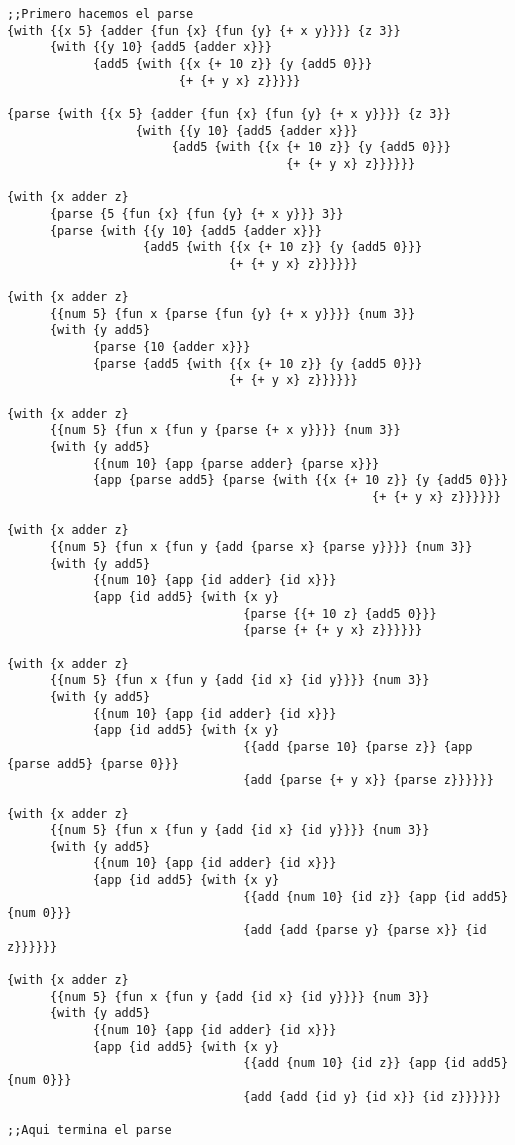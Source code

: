 \documentclass[a4paper]{article}
\begin{document}
\begin{verbatim}
;;Primero hacemos el parse
{with {{x 5} {adder {fun {x} {fun {y} {+ x y}}}} {z 3}}
      {with {{y 10} {add5 {adder x}}}
            {add5 {with {{x {+ 10 z}} {y {add5 0}}} 
                        {+ {+ y x} z}}}}}

{parse {with {{x 5} {adder {fun {x} {fun {y} {+ x y}}}} {z 3}}
                  {with {{y 10} {add5 {adder x}}}
                       {add5 {with {{x {+ 10 z}} {y {add5 0}}} 
		    	                       {+ {+ y x} z}}}}}}

{with {x adder z}
      {parse {5 {fun {x} {fun {y} {+ x y}}} 3}}
      {parse {with {{y 10} {add5 {adder x}}}
                   {add5 {with {{x {+ 10 z}} {y {add5 0}}}
                               {+ {+ y x} z}}}}}}

{with {x adder z}
      {{num 5} {fun x {parse {fun {y} {+ x y}}}} {num 3}}
      {with {y add5}
            {parse {10 {adder x}}}
            {parse {add5 {with {{x {+ 10 z}} {y {add5 0}}}
                               {+ {+ y x} z}}}}}}

{with {x adder z}
      {{num 5} {fun x {fun y {parse {+ x y}}}} {num 3}}
      {with {y add5}
            {{num 10} {app {parse adder} {parse x}}}
            {app {parse add5} {parse {with {{x {+ 10 z}} {y {add5 0}}} 
		   	                                       {+ {+ y x} z}}}}}}

{with {x adder z}
      {{num 5} {fun x {fun y {add {parse x} {parse y}}}} {num 3}}
      {with {y add5}
            {{num 10} {app {id adder} {id x}}}
            {app {id add5} {with {x y}
                                 {parse {{+ 10 z} {add5 0}}}
                                 {parse {+ {+ y x} z}}}}}}

{with {x adder z}
      {{num 5} {fun x {fun y {add {id x} {id y}}}} {num 3}}
      {with {y add5}
            {{num 10} {app {id adder} {id x}}}
            {app {id add5} {with {x y}
                                 {{add {parse 10} {parse z}} {app {parse add5} {parse 0}}}
                                 {add {parse {+ y x}} {parse z}}}}}}

{with {x adder z}
      {{num 5} {fun x {fun y {add {id x} {id y}}}} {num 3}}
      {with {y add5}
            {{num 10} {app {id adder} {id x}}}
            {app {id add5} {with {x y}
                                 {{add {num 10} {id z}} {app {id add5} {num 0}}}
                                 {add {add {parse y} {parse x}} {id z}}}}}}

{with {x adder z}
      {{num 5} {fun x {fun y {add {id x} {id y}}}} {num 3}}
      {with {y add5}
            {{num 10} {app {id adder} {id x}}}
            {app {id add5} {with {x y}
                                 {{add {num 10} {id z}} {app {id add5} {num 0}}}
                                 {add {add {id y} {id x}} {id z}}}}}}

;;Aqui termina el parse

\end{verbatim}
\end{document}
